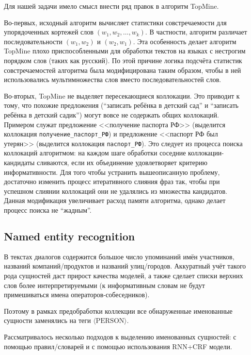 Для нашей задачи имело смысл внести ряд правок в алгоритм TopMine.

Во-первых, исходный алгоритм вычисляет статистики совстречаемости для упорядоченных кортежей слов $(w_1, w_2, \dots, w_k)$. В частности, алгоритм различает последовательности $(w_1, w_2)$ и $(w_2, w_1)$. Эта особенность делает алгоритм TopMine плохо приспособленными для обработки текстов на языках с нестрогим порядком слов (таких как русский). По этой причине логика подсчёта статистик совстречаемостей алгоритма была модифицирована таким образом, чтобы в ней использовались мультимножества слов вместо последовательностей слов.

Во-вторых, TopMine не выделяет пересекающиеся коллокации. Это приводит к тому, что похожие предложения (``записать ребёнка в детский сад'' и ``записать ребёнка в детский садик'') могут вовсе не содержать общих коллокаций. Примером служат предложение <<получение паспорта РФ>> (выделится коллокация \texttt{получение\_паспорт\_РФ}) и предложение <<паспорт РФ был утерян>> (выделится коллокация \texttt{паспорт\_РФ}). Это следует из процесса поиска коллокаций алгоритмом: на каждом шаге обработки соседние коллокации-кандидаты сливаются, если их объединение удовлетворяет критерию информативности. Для того чтобы устранить вышеописанную проблему, достаточно изменить процесс итеративного слияния фраз так, чтобы при успешном слиянии коллокаций они не удалялись из множества кандидатов. Данная модификация увеличивает расход памяти алгоритма, однако делает процесс поиска не ``жадным''.

\subsection{Named entity recognition}

\par В текстах диалогов содержится большое число упоминаний имён участников, названий компаний/продуктов и названий улиц/городов. Аккуратный учёт такого рода сущностей даст прирост качества моделей, а также сделает списки верхних слов более интерпретируемыми (к информативным словам не будут примешиваться имена операторов-собеседников).

Поэтому в рамках предобработки коллекции все обнаруженные именованные сущности заменялись на теги $\langle \mathrm{PERSON} \rangle$.

Рассматривалось несколько подходов к выделению именованных сущностей: с помощью правил/словарей и с помощью использования RNN+CRF модели.

